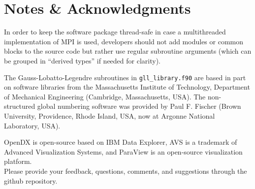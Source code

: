 
\chapter*{Notes \& Acknowledgments}

In order to keep the software package thread-safe in case a multithreaded
implementation of MPI is used, developers should not add modules or
common blocks to the source code but rather use regular subroutine
arguments (which can be grouped in ``derived types'' if needed for
clarity).

The Gauss-Lobatto-Legendre subroutines in \texttt{gll\_library.f90}
are based in part on software libraries from the Massachusetts Institute
of Technology, Department of Mechanical Engineering (Cambridge, Massachusetts,
USA). The non-structured global numbering software was provided by
Paul F. Fischer (Brown University, Providence, Rhode Island, USA,
now at Argonne National Laboratory, USA).

OpenDX  is open-source
based on IBM Data Explorer, AVS 
is a trademark of Advanced Visualization Systems, and ParaView 
is an open-source visualization platform.\\

Please provide your feedback, questions, comments, and suggestions through the github repository.

